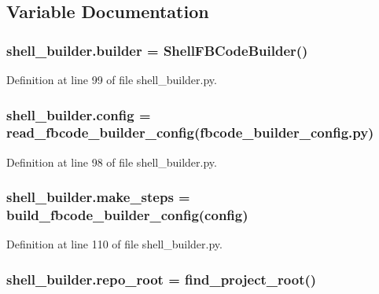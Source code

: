 \subsection{Variable Documentation}
\subsubsection[{builder}]{\setlength{\rightskip}{0pt plus 5cm}shell\+\_\+builder.\+builder = {\bf Shell\+F\+B\+Code\+Builder}()}\label{namespaceshell__builder_adf70a9cb6bd61c046b381d73df072458}


Definition at line 99 of file shell\+\_\+builder.\+py.

\subsubsection[{config}]{\setlength{\rightskip}{0pt plus 5cm}shell\+\_\+builder.\+config = read\+\_\+fbcode\+\_\+builder\+\_\+config(\textquotesingle{}fbcode\+\_\+builder\+\_\+config.\+py\textquotesingle{})}\label{namespaceshell__builder_a004b9b57795ec5d0c84ef02cdd19da98}


Definition at line 98 of file shell\+\_\+builder.\+py.

\subsubsection[{make\+\_\+steps}]{\setlength{\rightskip}{0pt plus 5cm}shell\+\_\+builder.\+make\+\_\+steps = build\+\_\+fbcode\+\_\+builder\+\_\+config({\bf config})}\label{namespaceshell__builder_a3f8028637462177e571e5898f632ca58}


Definition at line 110 of file shell\+\_\+builder.\+py.

\subsubsection[{repo\+\_\+root}]{\setlength{\rightskip}{0pt plus 5cm}shell\+\_\+builder.\+repo\+\_\+root = {\bf find\+\_\+project\+\_\+root}()}\label{namespaceshell__builder_ab1c4cf29b2f992438c1e8a25e6460ae9}


